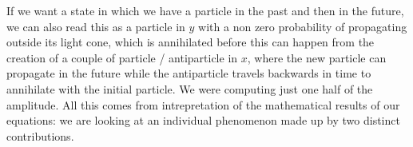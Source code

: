 \begin{figure}[H]
\end{figure}

If we want a state in which we have a particle in the past and then in the future, we can also read this as a particle in \(y\) with a non zero probability of propagating outside its light cone, which is annihilated before this can happen from the creation of a couple of particle / antiparticle in \(x\), where the new particle can propagate in the future while the antiparticle travels backwards in time to annihilate with the initial particle. We were computing just one half of the amplitude. All this comes from intrepretation of the mathematical results of our equations: we are looking at an individual phenomenon made up by two distinct contributions.

